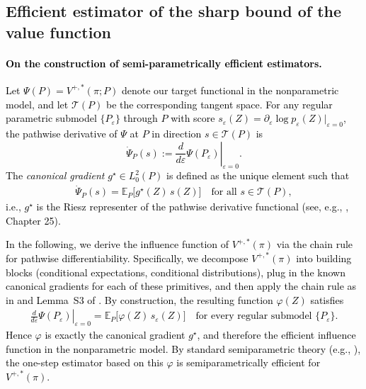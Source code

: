 \documentclass{article} %
\theoremstyle{plain}
\theoremstyle{definition}
\theoremstyle{remark}
\newcommand{\rebuttal}[1]{\textcolor{black}{#1}}
\begin{document}
\subsection{Efficient estimator of the sharp bound of the value function}\label{appendix:proof_v+}


\paragraph{\rebuttal{On the construction of semi-parametrically efficient estimators.}}
\rebuttal{Let $\Psi(P)=V^{+,*}(\pi;P)$ denote our target functional in the nonparametric model, 
and let $\mathcal{T}(P)$ be the corresponding tangent space. 
For any regular parametric submodel $\{P_\varepsilon\}$ through $P$ with score 
$s_\varepsilon(Z)=\partial_\varepsilon \log p_\varepsilon(Z)\vert_{\varepsilon=0}$, 
the pathwise derivative of $\Psi$ at $P$ in direction $s \in \mathcal{T}(P)$ is
\[
\dot\Psi_P(s)
:=
\left.\frac{d}{d\varepsilon}\Psi(P_\varepsilon)\right|_{\varepsilon=0}.
\]
The \emph{canonical gradient} $g^\star \in L_0^2(P)$ is defined as the unique element such that
\begin{align}
\dot\Psi_P(s) 
=
\mathbb{E}_P\big[g^\star(Z)\,s(Z)\big]
\quad\text{for all } s \in \mathcal{T}(P),
\end{align}
i.e., $g^\star$ is the Riesz representer of the pathwise derivative functional
(see, e.g., \citet{vanderVaart.1998}, Chapter 25).
}

\rebuttal{In the following, we derive the influence function of $V^{+,*}(\pi)$ via the chain rule for pathwise differentiability. Specifically, we decompose $V^{+,*}(\pi)$ into building blocks (conditional expectations, conditional distributions), plug in the known canonical gradients for each of these primitives, and then apply the chain rule as in \citet{Kennedy.2022} and Lemma~S3 of \citet{Luedtke.2024}. By construction, the resulting function $\varphi(Z)$ satisfies
\begin{align}
\left.\frac{d}{d\varepsilon}\Psi(P_\varepsilon)\right|_{\varepsilon=0}
=
\mathbb{E}_P\big[\varphi(Z)\,s_\varepsilon(Z)\big]
\quad\text{for every regular submodel } \{P_\varepsilon\}.
\end{align}
Hence $\varphi$ is exactly the canonical gradient $g^\star$, and therefore the efficient 
influence function in the nonparametric model. 
By standard semiparametric theory (e.g., \citet{vanderVaart.1998}), the one-step 
estimator based on this $\varphi$ is semiparametrically efficient for $V^{+,*}(\pi)$.
}
\end{document}
